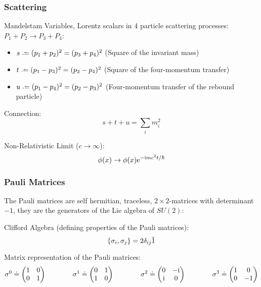 		\subsubsection{Scattering}
			\noindent
			Mandelstam Variables, \ie Lorentz scalars in 4 particle scattering processes: $P_1 + P_2 \to P_3 + P_4$:
			\begin{itemize}\itemsep -0pt
				\item $s\defeq (p_1+p_2)^2=(p_3+p_4)^2$ \hfill{(Square of the invariant mass)}
				\item $t\defeq (p_1-p_3)^2=(p_2-p_4)^2$ \hfill{(Square of the four-momentum transfer)}
				\item $u\defeq (p_1-p_4)^2=(p_2-p_3)^2$ \hfill{(Four-momentum transfer of the rebound particle)}
			\end{itemize}

			\noindent
			Connection:
			\begin{equation}
				s+t+u = \sum_i m_i^2
			\end{equation}

			\noindent
			Non-Relativistic Limit ($c \to\infty$):
			\begin{equation}
				\phi(x) \to \phi(x) \mathrm{e}^{-\mathrm{i} m c^2 t/\hbar}
			\end{equation}

		\subsubsection{Pauli Matrices}
			The Pauli matrices are self hermitian, traceless, $2\times 2$-matrices with determinant $-1$, they are the generators of the Lie algebra of $SU(2)$:

			Clifford Algebra (defining properties of the Pauli matrices):
			\begin{equation}
				\acomm{\sigma_i}{\sigma_j} = 2\delta_{ij}\hat{1}
			\end{equation}


			\noindent
			Matrix representation of the Pauli matrices:
			\begin{equation}
				\label{Eq:PauliMatricesQFT}
				\begin{aligned}
					\sigma^0 \doteq \mqty(
					1 & 0 \\
					0 & 1 \\
					) &&\hsp
					\sigma^1 \doteq \mqty(
					0 & 1 \\
					1 & 0 \\
					) &&\hsp
					\sigma^2 \doteq \mqty(
					0 & -\i \\
					\i & 0 \\
					) &&\hsp
					\sigma^3 \doteq \mqty(
					1 & 0 \\
					0 & -1 \\
					)
				\end{aligned}
			\end{equation}

